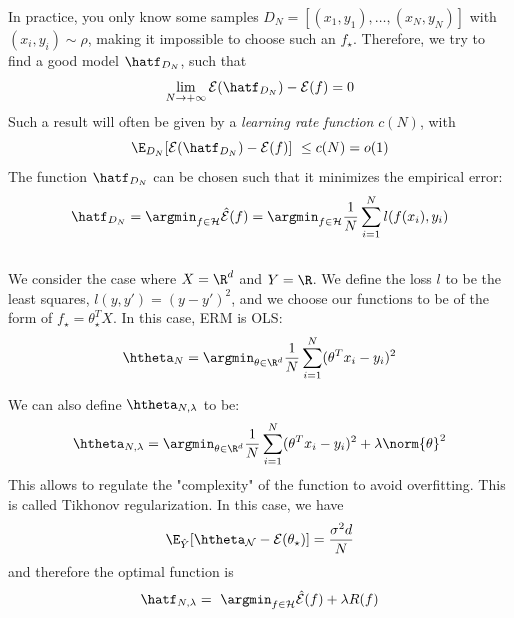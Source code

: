 \documentclass{../cs-classes/cs-classes}
\begin{document}
In practice, you only know some samples $D_N=[(x_1, y_1), \dots, (x_N, y_N)]$ with $(x_i, y_i) \sim \rho$, making it impossible to choose such an $f_\star$. Therefore, we try to find a good model $\hatf_{D_N}$, such that
\begin{equation*}
    \lim_{N\to+\infty}\mathcal{E}(\hatf_{D_N}) - \mathcal{E}(f) = 0
\end{equation*}
Such a result will often be given by a \emph{learning rate function} $c(N)$, with
\begin{equation*}
    \E_{D_N}[\mathcal{E}(\hatf_{D_N}) - \mathcal{E}(f)] \leq c(N) = o(1)
\end{equation*}
The function $\hatf_{D_N}$ can be chosen such that it minimizes the empirical error:
\begin{equation*}
    \hatf_{D_N} = \argmin_{f\in\mathcal{H}}\hat{\mathcal{E}}(f) = \argmin_{f\in\mathcal{H}} \frac{1}{N} \sum_{i=1}^N l(f(x_i), y_i)
\end{equation*}

\subsection{}
We consider the case where $X=\R^d$ and $Y=\R$. We define the loss $l$ to be the least squares, $l(y, y') = (y-y')^2$, and we choose our functions to be of the form of $f_\star = \theta_\star^T X$. In this case, ERM is OLS:
\begin{equation*}
    \htheta_N = \argmin_{\theta\in\R^d} \frac{1}{N} \sum_{i=1}^N (\theta^Tx_i-y_i)^2
\end{equation*}

We can also define $\htheta_{N, \lambda}$ to be:
\begin{equation*}
    \htheta_{N, \lambda} = \argmin_{\theta\in\R^d} \frac{1}{N} \sum_{i=1}^N (\theta^Tx_i-y_i)^2 + \lambda\norm{\theta}^2
\end{equation*}
This allows to regulate the "complexity" of the function to avoid overfitting. This is called Tikhonov regularization. In this case, we have
\begin{equation*}
    \E_{\hat{Y}}[\mathcal{\htheta_N} - \mathcal{E}(\theta_\star)] = \frac{\sigma^2 d}{N}
\end{equation*}
and therefore the optimal function is 
\begin{equation*}
    \hatf_{N, \lambda} = \argmin_{f\in\mathcal{H}} \hat{\mathcal{E}}(f) + \lambda R(f)
\end{equation*}
\end{document}
